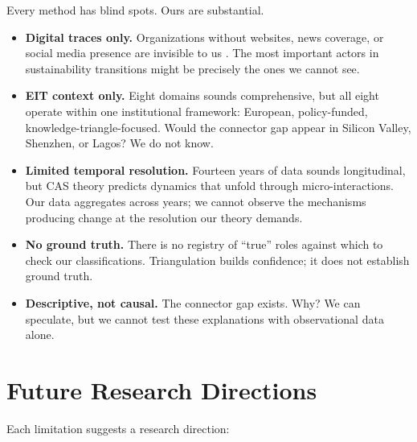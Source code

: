\documentclass[../main.tex]{subfiles}
\begin{document}
Every method has blind spots. Ours are substantial.

\begin{itemize}[leftmargin=*, itemsep=0.3em]
\item \textbf{Digital traces only.} Organizations without websites, news coverage, or social media presence are invisible to us \cite{boyd2012critical,tufekci2014big}. The most important actors in sustainability transitions might be precisely the ones we cannot see.
\item \textbf{EIT context only.} Eight domains sounds comprehensive, but all eight operate within one institutional framework: European, policy-funded, knowledge-triangle-focused. Would the connector gap appear in Silicon Valley, Shenzhen, or Lagos? We do not know.
\item \textbf{Limited temporal resolution.} Fourteen years of data sounds longitudinal, but CAS theory predicts dynamics that unfold through micro-interactions. Our data aggregates across years; we cannot observe the mechanisms producing change at the resolution our theory demands.
\item \textbf{No ground truth.} There is no registry of ``true'' roles against which to check our classifications. Triangulation builds confidence; it does not establish ground truth.
\item \textbf{Descriptive, not causal.} The connector gap exists. Why? We can speculate, but we cannot test these explanations with observational data alone.
\end{itemize}


\section{Future Research Directions}

Each limitation suggests a research direction:
\end{document}
